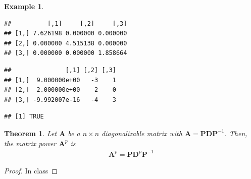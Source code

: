 \documentclass[
]{book}
\newenvironment{Shaded}{\begin{snugshade}}{\end{snugshade}}
\newcommand{\KeywordTok}[1]{\textcolor[rgb]{0.13,0.29,0.53}{\textbf{#1}}}
\newcommand{\NormalTok}[1]{#1}
\newcommand{\OperatorTok}[1]{\textcolor[rgb]{0.81,0.36,0.00}{\textbf{#1}}}
\newcommand{\StringTok}[1]{\textcolor[rgb]{0.31,0.60,0.02}{#1}}
\newtheorem{theorem}{Theorem}[chapter]
\theoremstyle{definition}
\theoremstyle{definition}
\newtheorem{example}{Example}[chapter]
\theoremstyle{definition}
\theoremstyle{definition}
\theoremstyle{remark}
\begin{document}
\begin{example}
\begin{Shaded}
\end{Shaded}

\begin{verbatim}
##          [,1]     [,2]     [,3]
## [1,] 7.626198 0.000000 0.000000
## [2,] 0.000000 4.515138 0.000000
## [3,] 0.000000 0.000000 1.858664
\end{verbatim}

\begin{Shaded}
\end{Shaded}

\begin{verbatim}
##               [,1] [,2] [,3]
## [1,]  9.000000e+00   -3    1
## [2,]  2.000000e+00    2    0
## [3,] -9.992007e-16   -4    3
\end{verbatim}

\begin{Shaded}
\end{Shaded}

\begin{verbatim}
## [1] TRUE
\end{verbatim}

\end{example}

\begin{theorem}
Let \(\mathbf{A}\) be a \(n \times n\) diagonalizable matrix with \(\mathbf{A} = \mathbf{P} \mathbf{D} \mathbf{P}^{-1}\). Then, the matrix power \(\mathbf{A}^p\) is
\[
\begin{aligned}
\mathbf{A}^p = \mathbf{P} \mathbf{D}^p \mathbf{P}^{-1}
\end{aligned}
\]
\end{theorem}

\begin{proof}
In class
\end{proof}
\end{document}
